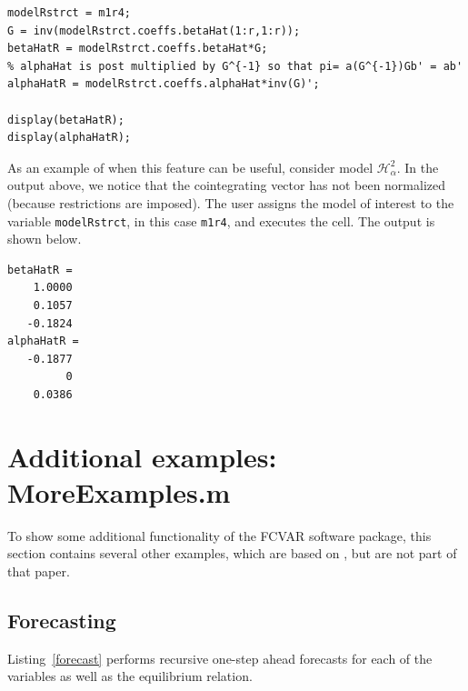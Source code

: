 \documentclass[10pt]{article}
\begin{document}
\begin{lstlisting}[frame=single,caption={Normalizing output}, label = normOut]
%% RESTRICTED MODEL OUTPUT - print normalized beta and alpha for model m1r4.
modelRstrct = m1r4;
G = inv(modelRstrct.coeffs.betaHat(1:r,1:r));
betaHatR = modelRstrct.coeffs.betaHat*G;
% alphaHat is post multiplied by G^{-1} so that pi= a(G^{-1})Gb' = ab'
alphaHatR = modelRstrct.coeffs.alphaHat*inv(G)';

display(betaHatR);
display(alphaHatR);
\end{lstlisting}

As an example of when this feature can be useful, consider model $\mathscr{H}_{\alpha}^2$. In the output above, we notice that the cointegrating vector has not been normalized (because restrictions are imposed). The user assigns the model of interest to the variable \verb|modelRstrct|, in this case \verb|m1r4|, and executes the cell. The output is shown below.

\begin{verbatim}
betaHatR =
    1.0000
    0.1057
   -0.1824
alphaHatR =
   -0.1877
         0
    0.0386
    \end{verbatim}


\section{Additional examples: MoreExamples.m}
\label{sec:examples}

To show some additional functionality of the FCVAR software package, this section contains several other examples, which are based on \cite{JNP2014}, but are not part of that paper.

\subsection{Forecasting}
\label{sec:forecasting}

Listing~\ref{forecast} performs recursive one-step ahead forecasts for each of the variables as well as the equilibrium relation. 
\end{document}
